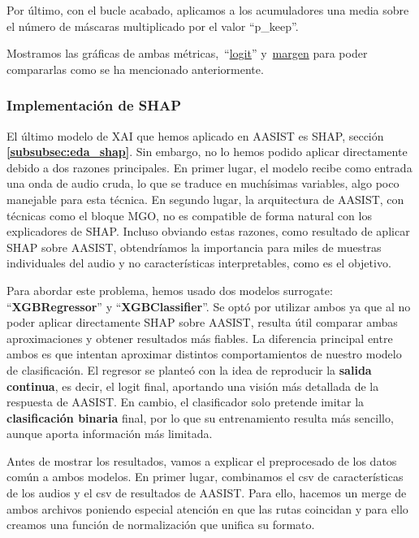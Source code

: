 Por último, con el bucle acabado, aplicamos a los acumuladores una media sobre el número de máscaras multiplicado por el valor ``p\_keep''.

Mostramos las gráficas de ambas métricas,~``\href{https://github.com/NILGroup/tfg-2526-xplicavoz/blob/main/Memoria/imagenes/AASIST_RISE_logit.png}{logit}'' y~\href{https://github.com/NILGroup/tfg-2526-xplicavoz/blob/main/Memoria/imagenes/AASIST_RISE_margin.png}{margen} para poder compararlas como se ha mencionado anteriormente.

\subsubsection*{Implementación de SHAP}

El último modelo de XAI que hemos aplicado en AASIST es SHAP, sección \textbf{\ref{subsubsec:eda_shap}}. Sin embargo, no lo hemos podido aplicar directamente debido a dos razones principales. En primer lugar, el modelo recibe como entrada una onda de audio cruda, lo que se traduce en muchísimas variables, algo poco manejable para esta técnica. En segundo lugar, la arquitectura de AASIST, con técnicas como el bloque MGO, no es compatible de forma natural con los explicadores de SHAP. Incluso obviando estas razones, como resultado de aplicar SHAP sobre AASIST, obtendríamos la importancia para miles de muestras individuales del audio y no características interpretables, como es el objetivo.

Para abordar este problema, hemos usado dos modelos surrogate: ``\textbf{XGBRegressor}'' y ``\textbf{XGBClassifier}''. Se optó por utilizar ambos ya que al no poder aplicar directamente SHAP sobre AASIST, resulta útil comparar ambas aproximaciones y obtener resultados más fiables. La diferencia principal entre ambos es que intentan aproximar distintos comportamientos de nuestro modelo de clasificación. El regresor se planteó con la idea de reproducir la \textbf{salida continua}, es decir, el logit final, aportando una visión más detallada de la respuesta de AASIST. En cambio, el clasificador solo pretende imitar la \textbf{clasificación binaria} final, por lo que su entrenamiento resulta más sencillo, aunque aporta información más limitada.

Antes de mostrar los resultados, vamos a explicar el preprocesado de los datos común a ambos modelos.
En primer lugar, combinamos el csv de características de los audios y el csv de resultados de AASIST. Para ello, hacemos un merge de ambos archivos poniendo especial atención en que las rutas coincidan y para ello creamos una función de normalización que unifica su formato.

